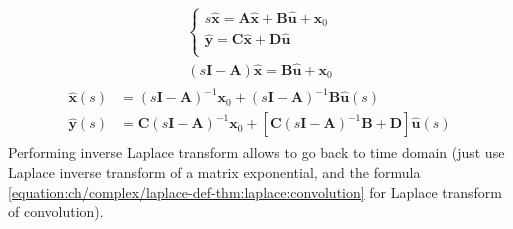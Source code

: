 \documentclass[letterpaper,10pt,english]{jupyterBook}
\begin{document}
\begin{equation*}
\begin{split}\begin{cases}
   s \hat{\mathbf{x}} = \mathbf{A} \hat{\mathbf{x}} + \mathbf{B} \hat{\mathbf{u}} + \mathbf{x}_0 \\
     \hat{\mathbf{y}} = \mathbf{C} \hat{\mathbf{x}} + \mathbf{D} \hat{\mathbf{u}} \\
\end{cases}\end{split}
\end{equation*}\begin{equation*}
\begin{split}(s\mathbf{I} - \mathbf{A}) \hat{\mathbf{x}} = \mathbf{B} \hat{\mathbf{u}} + \mathbf{x}_0\end{split}
\end{equation*}\begin{equation*}
\begin{split}\begin{aligned}
  \hat{\mathbf{x}}(s) & = (s\mathbf{I} - \mathbf{A})^{-1} \mathbf{x}_0 + (s\mathbf{I} - \mathbf{A})^{-1} \mathbf{B} \hat{\mathbf{u}}(s) \\
  \hat{\mathbf{y}}(s) & = \mathbf{C} (s\mathbf{I} - \mathbf{A})^{-1}\mathbf{x}_0 + \left[ \mathbf{C} (s\mathbf{I} - \mathbf{A})^{-1} \mathbf{B} + \mathbf{D} \right] \hat{\mathbf{u}}(s)
\end{aligned}\end{split}
\end{equation*}
\sphinxAtStartPar
Performing inverse Laplace transform allows to go back to time domain (just use Laplace inverse transform of a matrix exponential, and the formula \eqref{equation:ch/complex/laplace-def-thm:laplace:convolution} for Laplace transform of convolution).
\end{document}
